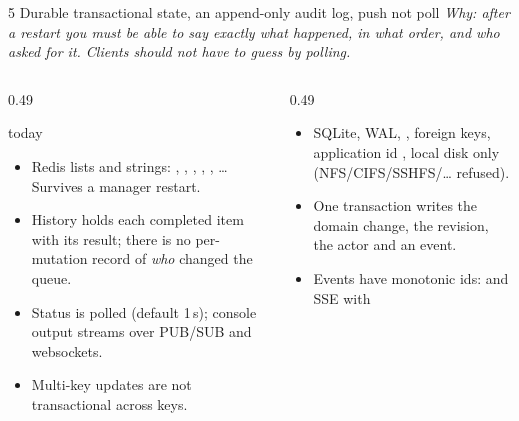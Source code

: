 \begin{frame}{5 \quad Durable transactional state, an append-only audit log, push not poll}
    {\footnotesize\itshape Why: after a restart you must be able to say exactly what happened, in what order,
    and who asked for it. Clients should not have to guess by polling.}
    \vspace{0.05cm}
    \begin{columns}[T]
        \begin{column}{0.49\textwidth}
            \begin{alertblock}{\legacy{} today}
                \footnotesize
                \begin{itemize}
                    \item Redis lists and strings: , ,
                          , , , \ldots{}
                          Survives a manager restart. 
                    \item History holds each completed item with its result; there is no per-mutation
                          record of \emph{who} changed the queue.
                    \item Status is polled (default 1\,s); console output streams over PUB/SUB and
                          websockets. 
                    \item Multi-key updates are not transactional across keys.
                \end{itemize}
            \end{alertblock}
        \end{column}
        \begin{column}{0.49\textwidth}
            \begin{block}{\vtwo{}}
                \footnotesize
                \begin{itemize}
                    \item SQLite, WAL, , foreign keys, application id ,
                          local disk only (NFS/CIFS/SSHFS/\ldots{} refused). 
                    \item One  transaction writes the domain change, the revision,
                          the actor and an event. 
                    \item Events have monotonic ids:  and SSE with

\end{itemize}
\end{block}
\end{column}
\end{columns}
\end{frame}
